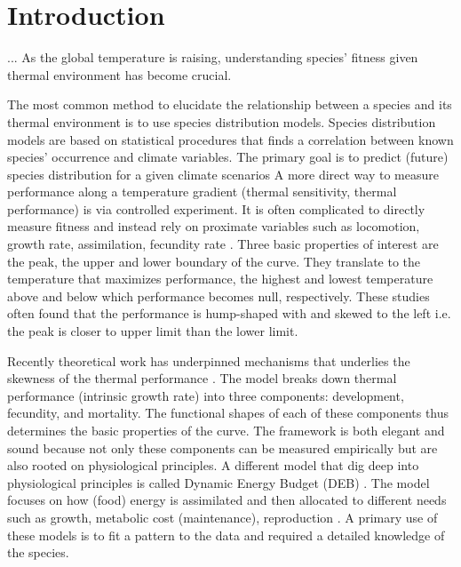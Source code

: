 \section*{Introduction}
...
As the global temperature is raising, understanding species' fitness given thermal environment has become crucial.

The most common method to elucidate the relationship between a species and its thermal environment is to use species distribution models. 
Species distribution models are based on  statistical procedures that finds a correlation between known species' occurrence and climate variables.
The primary goal is to predict (future) species distribution for a given climate scenarios \citep{Guisan2005, Austin2007, Elith2009}
A more direct way to measure performance along a temperature gradient (thermal sensitivity, thermal performance) is via controlled experiment.
It is often complicated to directly measure fitness and instead rely on proximate variables such as locomotion, growth rate, assimilation, fecundity rate \citep[][and reference therein]{Angiletta2009}.
Three basic properties of interest are the peak, the upper and lower boundary of the curve.
They translate to the temperature that maximizes performance, the highest and lowest temperature above and below which performance becomes null, respectively. 
These studies often found that the performance is hump-shaped with and skewed to the left i.e. the peak is closer to upper limit than the lower limit.

Recently theoretical work has underpinned mechanisms that underlies the skewness of the thermal performance \citep{Amarasekare2012}.
The model  breaks down thermal performance (intrinsic growth rate)  into three components: development, fecundity, and mortality.
The functional shapes of each of these components thus determines the basic properties of the curve.
The framework is both elegant and sound because not only these components can be measured empirically but are also rooted on physiological principles.
A different model that dig deep into physiological principles is called Dynamic Energy Budget (DEB) \citep{Kooijman2009}.
The model focuses on how (food) energy is assimilated and then allocated to different needs such as growth, metabolic cost (maintenance), reproduction \citep{Kooijman2009}.
A primary use of  these models is to fit a pattern to the data and required a detailed knowledge of the species.  

